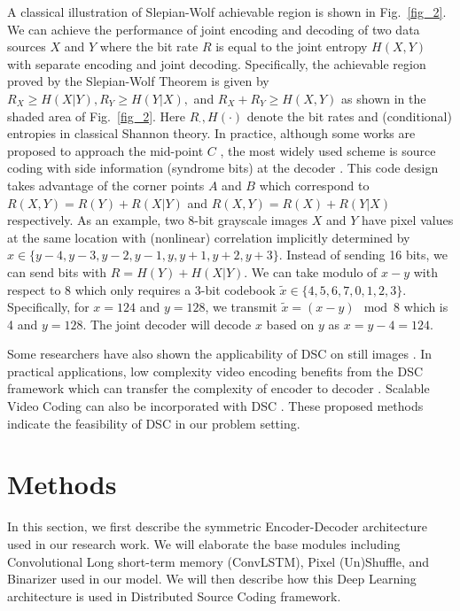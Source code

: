 \documentclass[10pt,twocolumn,letterpaper]{article}
\begin{document}
A classical illustration of Slepian-Wolf achievable region is shown in Fig.~\ref{fig_2}. We can achieve the performance of joint encoding and decoding of two data sources $X$ and $Y$ where the bit rate $R$ is equal to the joint entropy $H(X,Y)$ with separate encoding and joint decoding. Specifically, the achievable region proved by the Slepian-Wolf Theorem is given by $R_X\geq H(X|Y),R_Y\geq H(Y|X),$ and $R_X+R_Y\geq H(X,Y)$ as shown in the shaded area of Fig.~\ref{fig_2}. Here $R_{\cdot},H(\cdot)$ denote the bit rates and (conditional) entropies in classical Shannon theory. In practice, although some works are proposed to approach the mid-point $C$ \cite{schonberg2004distributed}, the most widely used scheme is source coding with side information (syndrome bits) at the decoder \cite{pradhan2003distributed}. This code design takes advantage of the corner points $A$ and $B$ which correspond to $R(X,Y) = R(Y)+R(X|Y)$ and $R(X,Y) = R(X)+R(Y|X)$ respectively. As an example, two 8-bit grayscale images $X$ and $Y$ have pixel values at the same location with (nonlinear) correlation implicitly determined by $x \in \{y-4, y-3, y-2, y-1, y, y+1, y+2, y+3\}$. Instead of sending 16 bits, we can send bits with $R=H(Y)+H(X|Y)$. We can take modulo of $x-y$ with respect to $8$ which only requires a 3-bit codebook $\tilde{x} \in \{4, 5, 6, 7, 0, 1, 2, 3\}$. Specifically, for $x=124$ and $y=128$, we transmit $\tilde{x}=(x-y) \mod 8$ which is 4 and $y=128$. The joint decoder will decode $x$ based on $y$ as $x = y-4 = 124$.

Some researchers have also shown the applicability of DSC on still images \cite{dikici2005distributed}. In practical applications, low complexity video encoding benefits from the DSC framework which can transfer the complexity of encoder to decoder \cite{puri2002prism,aaron2002wyner}. Scalable Video Coding can also be incorporated with DSC \cite{xu2006layered}. These proposed methods indicate the feasibility of DSC in our problem setting.

\section{Methods}
In this section, we first describe the symmetric Encoder-Decoder architecture used in our research work. We will elaborate the base modules including Convolutional Long short-term memory (ConvLSTM), Pixel (Un)Shuffle, and Binarizer used in our model. We will then describe how this Deep Learning architecture is used in Distributed Source Coding framework.
\end{document}

